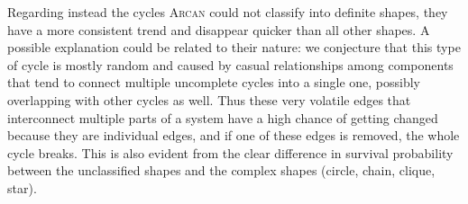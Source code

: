 Regarding instead the cycles \textsc{Arcan} could not classify into definite shapes, they have a more consistent trend and disappear quicker than all other shapes.
A possible explanation could be related to their nature: we conjecture that this type of cycle is mostly random and caused by casual relationships among components that tend to connect multiple uncomplete cycles into a single one, possibly overlapping with other cycles as well.
Thus these very volatile edges that interconnect multiple parts of a system have a high chance of getting changed because they are individual edges, and if one of these edges is removed, the whole cycle breaks.
This is also evident from the clear difference in survival probability between the unclassified shapes and the complex shapes (circle, chain, clique, star).




